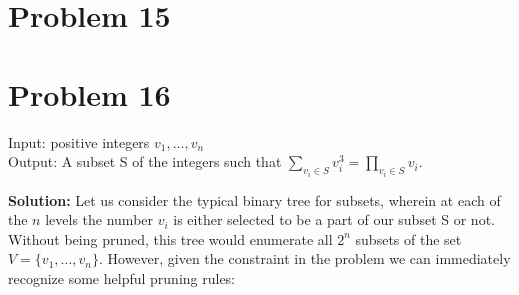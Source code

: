 \documentclass{article}
\providecommand{\prob}[1]{\section*{Problem #1}}
\providecommand{\soln}{\textbf{Solution: }}
\begin{document}
\prob{15}








\prob{16}
Input: positive integers $v_1, \dots , v_n$\\
Output: A subset S of the integers such that $\sum_{v_i \in S}v_i^3 = \prod_{v_i \in S}v_i$.\par \medskip
\soln
Let us consider the typical binary tree for subsets, wherein at each of the $n$ levels the number $v_i$ is either selected to be a part of our subset S or not. Without being pruned, this tree would enumerate all $2^n$ subsets of the set $V = \{v_1,\dots,v_n\}$. However, given the constraint in the problem we can immediately recognize some helpful pruning rules:\par
\end{document}
